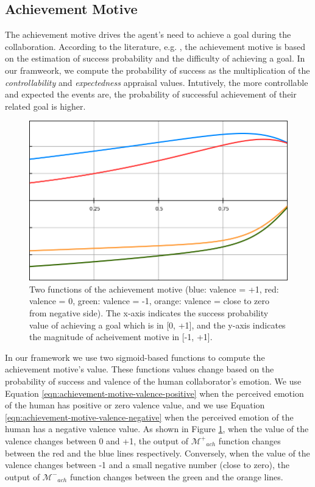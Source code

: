 \documentclass[12pt]{report}
\begin{document}
\subsection{Achievement Motive}
The achievement motive drives the agent's need to achieve a goal during the
collaboration. According to the literature, e.g.
\cite{merrick:acheievement-affiliation-power}, the achievement motive is based
on the estimation of success probability and the difficulty of achieving a goal.
In our framweork, we compute the probability of success as the multiplication of
the \textit{controllability} and \textit{expectedness} appraisal values.
Intutively, the more controllable and expected the events are, the probability
of successful achievement of their related goal is higher.

\begin{figure}[tbh]
  \centering
  \includegraphics[width=1\textwidth]{figure/achievement_motive_functions.png}
  \caption{Two functions of the achievement motive (blue: valence = +1, red:
  valence = 0, green: valence = -1, orange: valence = close to zero from
  negative side). The x-axis indicates the success probability value of
  achieving a goal which is in [0, +1], and the y-axis indicates the magnitude
  of acheivement motive in [-1, +1].}
  \label{fig:achievement-motive-functions}
\end{figure}

In our framework we use two sigmoid-based functions to compute the achievement
motive's value. These functions values change based on the probability of
success and valence of the human collaborator's emotion. We use Equation
\ref{eqn:achievement-motive-valence-positive} when the perceived emotion of the
human has positive or zero valence value, and we use Equation
\ref{eqn:achievement-motive-valence-negative} when the perceived emotion
of the human has a negative valence value. As shown in Figure
\ref{fig:achievement-motive-functions}, when the value of the valence changes
between 0 and +1, the output of $\mathcal{M^{+}}_{ach}$ function changes between
the red and the blue lines respectively. Conversely, when the value of the
valence changes between -1 and a small negative number (close to zero), the
output of $\mathcal{M^{-}}_{ach}$ function changes between the green and the
orange lines.
\end{document}

